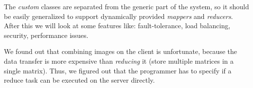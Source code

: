 \documentclass{article}
\begin{document}
The \emph{custom} classes are separated from the generic part of the system, 
so it should be easily generalized to support dynamically provided 
\emph{mappers} and \emph{reducers}. After this we will look at some features
like: fault-tolerance, load balancing, security, performance issues.

We found out that combining images on the client is unfortunate, because the 
data transfer is more expensive than \emph{reducing} it (store multiple 
matrices in a single matrix). Thus, we figured out that the programmer has to 
specify if a reduce task can be executed on the server directly.


\end{document}
